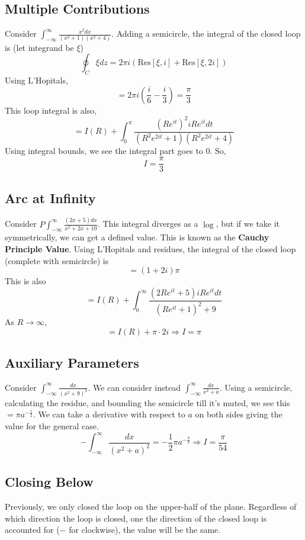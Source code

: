 \documentclass[../main.tex]{subfiles}
\begin{document}
\subsection{Multiple Contributions}
Consider $\int_{-\infty}^{\infty}\frac{x^{2}dx}{(x^{2}+1)(x^{2}+4)}$.
Adding a semicircle, the integral of the closed loop is (let integrand be $\xi$)
$$\oint_{C}\xi dz=2\pi i\left(\text{Res}[\xi, i]+\text{Res}[\xi, 2i]\right)$$
Using L'Hopitals,
$$=2\pi i\left(\frac{i}{6}-\frac{i}{3}\right)=\frac{\pi}{3}$$
This loop integral is also,
$$=I(R)+\int_{0}^{\pi}\frac{(Re^{it})^{2}iRe^{it}dt}{(R^{2}e^{2it}+1)(R^{2}e^{2it}+4)}$$
Using integral bounds, we see the integral part goes to 0. So,
$$I=\frac{\pi}{3}$$

\subsection{Arc at Infinity}
Consider $P\int_{-\infty}^{\infty}\frac{(2x+5)dx}{x^{2}+2x+10}$. This integral diverges as a $\log$, but if we 
take it symmetrically, we can get a defined value. This is known as the \textbf{Cauchy Principle Value}.
Using L'Hopitals and residues, the integral of the closed loop (complete with semicircle) is
$$=(1+2i)\pi$$
This is also
$$=I(R)+\int_{0}^{\infty}\frac{(2Re^{it}+5)iRe^{it}dt}{(Re^{it}+1)^{2}+9}$$
As $R\rightarrow \infty$,
$$=I(R)+\pi\cdot 2i\Rightarrow I=\pi$$

\subsection{Auxiliary Parameters}
Consider $\int_{-\infty}^{\infty}\frac{dx}{(x^{2}+9)^{2}}$. We can consider instead
$\int_{-\infty}^{\infty}\frac{dx}{x^{2}+a}$. Using a semicircle, calculating the residue, and bounding 
the semicircle till it's muted, we see this $=\pi a^{-\frac{1}{2}}$.
We can take a derivative with respect to $a$ on both sides giving the value for the general case.
$$-\int_{-\infty}^{\infty}\frac{dx}{(x^{2}+a)^{2}}=-\frac{1}{2}\pi a^{-\frac{3}{2}}
\Rightarrow I=\frac{\pi}{54}$$

\subsection{Closing Below}
Previously, we only closed the loop on the upper-half of the plane. Regardless of which direction the loop is closed,
one the direction of the closed loop is accounted for ($-$ for clockwise), the value will be the same.
\end{document}
